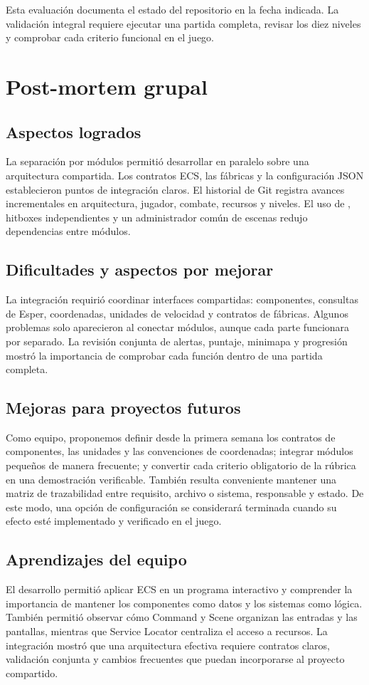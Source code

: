 \documentclass[12pt,letterpaper]{report}
\newcommand{\archivo}[1]{\texttt{\detokenize{#1}}}
\begin{document}
Esta evaluación documenta el estado del repositorio en la fecha indicada. La validación integral requiere ejecutar una partida completa, revisar los diez niveles y comprobar cada criterio funcional en el juego.

\chapter{Post-mortem grupal}

\section{Aspectos logrados}
La separación por módulos permitió desarrollar en paralelo sobre una arquitectura compartida. Los contratos ECS, las fábricas y la configuración JSON establecieron puntos de integración claros. El historial de Git registra avances incrementales en arquitectura, jugador, combate, recursos y niveles. El uso de \archivo{delta_time}, hitboxes independientes y un administrador común de escenas redujo dependencias entre módulos.

\section{Dificultades y aspectos por mejorar}
La integración requirió coordinar interfaces compartidas: componentes, consultas de Esper, coordenadas, unidades de velocidad y contratos de fábricas. Algunos problemas solo aparecieron al conectar módulos, aunque cada parte funcionara por separado. La revisión conjunta de alertas, puntaje, minimapa y progresión mostró la importancia de comprobar cada función dentro de una partida completa.

\section{Mejoras para proyectos futuros}
Como equipo, proponemos definir desde la primera semana los contratos de componentes, las unidades y las convenciones de coordenadas; integrar módulos pequeños de manera frecuente; y convertir cada criterio obligatorio de la rúbrica en una demostración verificable. También resulta conveniente mantener una matriz de trazabilidad entre requisito, archivo o sistema, responsable y estado. De este modo, una opción de configuración se considerará terminada cuando su efecto esté implementado y verificado en el juego.

\section{Aprendizajes del equipo}
El desarrollo permitió aplicar ECS en un programa interactivo y comprender la importancia de mantener los componentes como datos y los sistemas como lógica. También permitió observar cómo Command y Scene organizan las entradas y las pantallas, mientras que Service Locator centraliza el acceso a recursos. La integración mostró que una arquitectura efectiva requiere contratos claros, validación conjunta y cambios frecuentes que puedan incorporarse al proyecto compartido.
\end{document}
